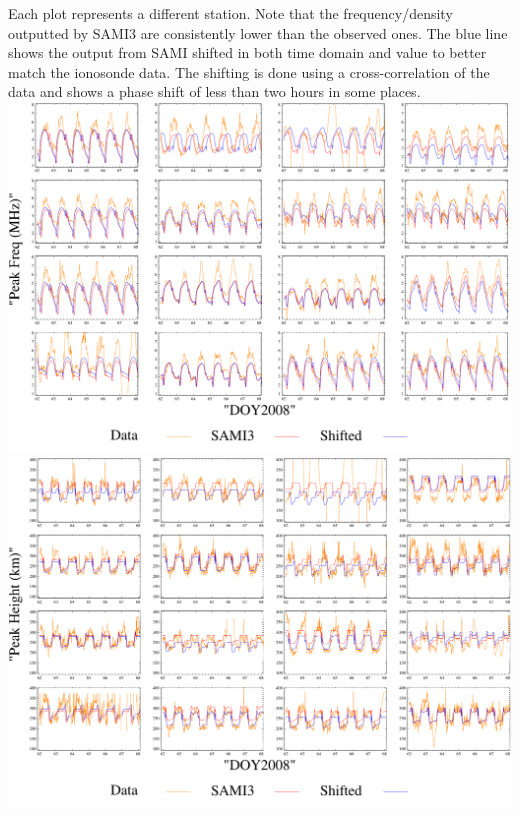 \documentclass[12pt]{IEEEtran}
\begin{document}
\IEEEPARstart E{ach} plot represents a different station. Note that the frequency/density outputted by SAMI3 are consistently lower than the observed ones. The blue line shows the output from SAMI shifted in both time domain and value to better match the ionosonde data. The shifting is done using a cross-correlation of the data and shows a phase shift of less than two hours in some places. 
    \includegraphics[width=\textwidth]{fs}
    \clearpage
  \includegraphics[width=\textwidth]{hs}
\end{document}
